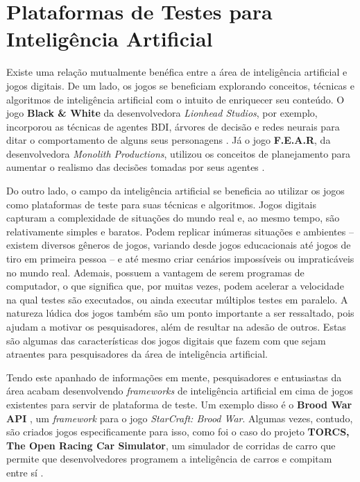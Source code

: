\section{Plataformas de Testes para Inteligência Artificial}
Existe uma relação mutualmente benéfica entre a área de inteligência artificial
e jogos digitais.  De um lado, os jogos se beneficiam explorando conceitos,
técnicas e algoritmos de inteligência artificial com o intuito de enriquecer seu
conteúdo. O jogo \textbf{Black \& White} da desenvolvedora \textit{Lionhead
Studios}, por exemplo, incorporou as técnicas de agentes BDI, árvores de decisão
e redes neurais para ditar o comportamento de alguns seus personagens
\cite{TOPAIGAMES}.  Já o jogo \textbf{F.E.A.R}, da desenvolvedora
\textit{Monolith Productions}, utilizou os conceitos de planejamento para
aumentar o realismo das decisões tomadas por seus agentes \cite{FEARPLANNING}.

Do outro lado, o campo da inteligência artificial se beneficia ao utilizar os
jogos como plataformas de teste para suas técnicas e algoritmos. Jogos digitais
capturam a complexidade de situações do mundo real e, ao mesmo tempo, são
relativamente simples e baratos. Podem replicar inúmeras situações e ambientes
-- existem diversos gêneros de jogos, variando desde jogos educacionais até
jogos de tiro em primeira pessoa -- e até mesmo criar cenários impossíveis ou
impraticáveis no mundo real. Ademais, possuem a vantagem de serem programas de
computador, o que significa que, por muitas vezes, podem acelerar a velocidade
na qual testes são executados, ou ainda executar múltiplos testes em paralelo.
A natureza lúdica dos jogos também são um ponto importante a ser ressaltado,
pois ajudam a motivar os pesquisadores, além de resultar na adesão de outros.
Estas são algumas das características dos jogos digitais que fazem com que
sejam atraentes para pesquisadores da área de inteligência artificial.

Tendo este apanhado de informações em mente, pesquisadores e entusiastas da área
acabam desenvolvendo \textit{frameworks} de inteligência artificial em cima de
jogos existentes para servir de plataforma de teste. Um exemplo disso é o
\textbf{Brood War API} \cite{BWAPI}, um \textit{framework} para o jogo
\textit{StarCraft: Brood War}. Algumas vezes, contudo, são criados jogos
especificamente para isso, como foi o caso do projeto \textbf{TORCS, The Open
Racing Car Simulator}, um simulador de corridas de carro que permite que
desenvolvedores programem a inteligência de carros e compitam entre sí
\cite{TORCSWEB}.

